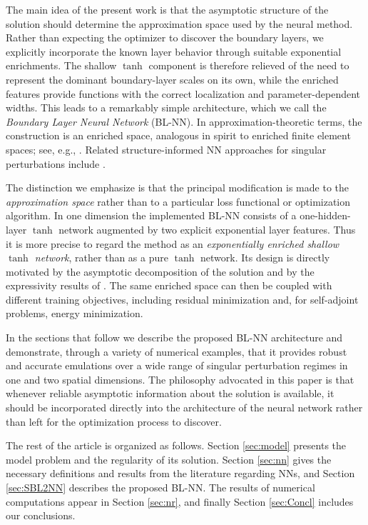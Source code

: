 \documentclass[11pt]{article}
\theoremstyle{plain}
\theoremstyle{definition}
\theoremstyle{remark}
\numberwithin{equation}{section}
\begin{document}
The main idea of the present work is that the asymptotic structure of the solution should determine the approximation space used by the neural method. Rather than expecting the optimizer to discover the boundary layers, we explicitly incorporate the known layer behavior through suitable exponential enrichments. The shallow $\tanh$ component is therefore relieved of the need to represent the dominant boundary-layer scales on its own, while the enriched features provide functions with the correct localization and parameter-dependent widths. This leads to a remarkably simple architecture, which we call the \emph{Boundary Layer Neural Network} (BL-NN). In approximation-theoretic terms, the construction is an enriched space, analogous in spirit to enriched finite element spaces; see, e.g., \cite{Kellogg}. Related structure-informed NN approaches for singular perturbations include \cite{ACD, CGGY, GHJL}.

The distinction we emphasize is that the principal modification is made to the \emph{approximation space} rather than to a particular loss functional or optimization algorithm. In one dimension the implemented BL-NN consists of a one-hidden-layer $\tanh$ network augmented by two explicit exponential layer features. Thus it is more precise to regard the method as an \emph{exponentially enriched shallow $\tanh$ network}, rather than as a pure $\tanh$ network. Its design is directly motivated by the asymptotic decomposition of the solution and by the expressivity results of \cite{OSX}. The same enriched space can then be coupled with different training objectives, including residual minimization and, for self-adjoint problems, energy minimization.

In the sections that follow we describe the proposed BL-NN architecture and demonstrate, through a variety of numerical examples, that it provides robust and accurate emulations over a wide range of singular perturbation regimes in one and two spatial dimensions.
%
The philosophy advocated in this paper is that whenever reliable asymptotic information about the solution is available, it should be incorporated directly into the architecture of the neural network rather than left for the optimization process to discover.

The rest of the article is organized as follows. Section \ref{sec:model} presents the model
problem and the regularity of its solution. Section \ref{sec:nn} gives the necessary 
definitions and results from the literature regarding NNs, and Section \ref{sec:SBL2NN} describes the proposed BL-NN. The results of numerical computations appear in Section \ref{sec:nr}, and finally Section \ref{sec:Concl} includes our conclusions.
\end{document}
